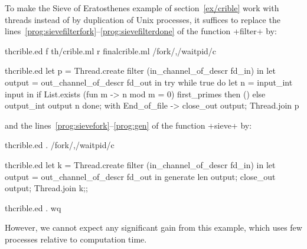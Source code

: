 \begin{example}
\label{ex/crible-copro}
To make the Sieve of Eratosthenes example of section~\ref{ex/crible}
work with threads instead of by duplication of Unix processes, 
it suffices to replace the 
lines~{\ref{prog:sievefilterfork}--\ref{prog:sievefilterdone}} of the 
function \ml+filter+ by:
%
\begin{codefile}{thcrible.ed}
f th/crible.ml
r finalcrible.ml
/fork/,/waitpid/c
\end{codefile}
%
\begin{listingcodefile}{thcrible.ed}
    let p = Thread.create filter (in_channel_of_descr fd_in) in
    let output = out_channel_of_descr fd_out in
    try 
      while true do
        let n = input_int input in
        if List.exists (fun m -> n mod m = 0) first_primes then ()
        else output_int output n
      done;
    with End_of_file -> 
      close_out output;
      Thread.join p
\end{listingcodefile}
%
and the lines~{\ref{prog:sievefork}--\ref{prog:gen}} of the function
\ml+sieve+ by:
%
\begin{codefile}{thcrible.ed}
.
/fork/,/waitpid/c
\end{codefile}
%
\begin{listingcodefile}{thcrible.ed}
  let k = Thread.create filter (in_channel_of_descr fd_in) in
  let output = out_channel_of_descr fd_out in
  generate len output;
  close_out output;
  Thread.join k;;
\end{listingcodefile}
%
\begin{codefile}{thcrible.ed}
.
wq
\end{codefile}
%
However, we cannot expect any significant gain from this example,
which uses few processes relative to computation time.
\end{example}


